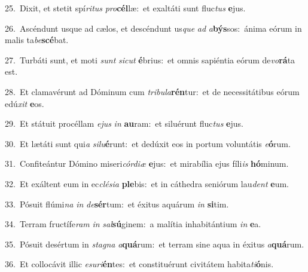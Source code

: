 {\numbfont\textcolor{\numbcolor}{25.}}~Dixit, et stetit spí\-\textit{ri}\-\textit{tus} \textit{pro}\-\textbf{cél}læ:~\star et exaltáti sunt fluc\textit{tus} \textbf{e}\-jus.\par
{\numbfont\textcolor{\numbcolor}{26.}}~Ascéndunt usque ad cælos, et descéndunt us\textit{que} \textit{ad} \textit{a}\-\textbf{býs}sos:~\star ánima eórum in malis ta\-\textit{be}\-\textbf{scé}bat.\par
{\numbfont\textcolor{\numbcolor}{27.}}~Turbáti sunt, et moti \textit{sunt} \textit{sic}\-\textit{ut} \textbf{é}\-brius:~\star et omnis sapiéntia eórum de\-\textit{vo}\-\textbf{rá}ta est.\par
{\numbfont\textcolor{\numbcolor}{28.}}~Et clamavérunt ad Dóminum cum \textit{tri}\-\textit{bu}\textit{la}\textbf{rén}tur:~\star et de necessitátibus eórum edú\textit{xit} \textbf{e}\-os.\par
{\numbfont\textcolor{\numbcolor}{29.}}~Et státuit procéllam \textit{e}\-\textit{jus} \textit{in} \textbf{au}\-ram:~\star et siluérunt fluc\textit{tus} \textbf{e}\-jus.\par
{\numbfont\textcolor{\numbcolor}{30.}}~Et lætáti sunt qui\textit{a} \textit{si}\-\textit{lu}\textbf{é}runt:~\star et dedúxit eos in portum voluntátis \textit{e}\-\textbf{ó}rum.\par
{\numbfont\textcolor{\numbcolor}{31.}}~Confiteántur Dómino miseri\-\textit{cór}\-\textit{di}\textit{æ} \textbf{e}\-jus:~\star et mirabília ejus fíli\textit{is} \textbf{hó}\-minum.\par
{\numbfont\textcolor{\numbcolor}{32.}}~Et exáltent eum in ec\-\textit{clé}\-\textit{si}\textit{a} \textbf{ple}\-bis:~\star et in cáthedra seniórum lau\textit{dent} \textbf{e}\-um.\par
{\numbfont\textcolor{\numbcolor}{33.}}~Pósuit flúmi\textit{na} \textit{in} \textit{de}\-\textbf{sér}tum:~\star et éxitus aquárum \textit{in} \textbf{si}\-tim.\par
{\numbfont\textcolor{\numbcolor}{34.}}~Terram fructífe\textit{ram} \textit{in} \textit{sal}\-\textbf{sú}ginem:~\star a malítia inhabitántium \textit{in} \textbf{e}\-a.\par
{\numbfont\textcolor{\numbcolor}{35.}}~Pósuit desértum in \textit{sta}\-\textit{gna} \textit{a}\-\textbf{quá}rum:~\star et terram sine aqua in éxitus \textit{a}\-\textbf{quá}rum.\par
{\numbfont\textcolor{\numbcolor}{36.}}~Et collocávit illic \textit{e}\-\textit{su}\textit{ri}\textbf{én}tes:~\star et constituérunt civitátem habita\-\textit{ti}\-\textbf{ó}nis.\par
